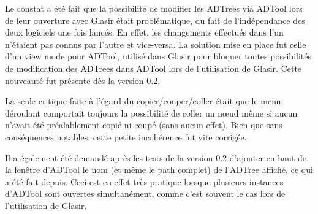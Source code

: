 Le constat a été fait que la possibilité de modifier les ADTrees via ADTool lors de leur ouverture avec Glasir était problématique, du fait de l'indépendance des deux logiciels une fois lancés. En effet, les changements effectués dans l'un n'étaient pas connus par l'autre et vice-versa. La solution mise en place fut celle d'un \og view mode \fg{} pour ADTool, utilisé dans Glasir pour bloquer toutes possibilités de modification des ADTrees dans ADTool lors de l'utilisation de Glasir. Cette nouveauté fut présente dès la version 0.2.

La seule critique faite à l'égard du copier/couper/coller était que le menu déroulant comportait toujours la possibilité de coller un n\oe{}ud même si aucun n'avait été préalablement copié ni coupé (sans aucun effet). Bien que sans conséquences notables, cette petite incohérence fut vite corrigée. 

Il a également été demandé après les tests de la version 0.2 d'ajouter en haut de la fenêtre d'ADTool le nom (et même le path complet) de l'ADTree affiché, ce qui a été fait depuis. Ceci est en effet très pratique lorsque plusieurs instances d'ADTool sont ouvertes simultanément, comme c'est souvent le cas lors de l'utilisation de Glasir. 






